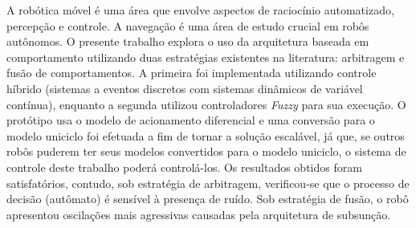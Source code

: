 \begin{resumo}

A robótica móvel é uma área que envolve aspectos de raciocínio automatizado, percepção e 
controle. A navegação é uma área de estudo crucial em robôs autônomos. O presente trabalho 
explora o uso da arquitetura baseada em comportamento utilizando duas estratégias existentes 
na literatura: arbitragem e fusão de comportamentos. A primeira foi implementada utilizando 
controle híbrido (sistemas a eventos discretos com sistemas dinâmicos de variável contínua), 
enquanto a segunda utilizou controladores \textit{Fuzzy} para sua execução. O protótipo usa 
o modelo de acionamento diferencial e uma conversão para o modelo uniciclo foi efetuada a fim
de tornar a solução escalável, já que, se outros robôs puderem ter seus modelos convertidos 
para o modelo uniciclo, o sistema de controle deste trabalho poderá controlá-los. Os 
resultados obtidos foram satisfatórios, contudo, sob estratégia de arbitragem, verificou-se
que o processo de decisão (autômato) é sensível à presença de ruído. Sob estratégia de 
fusão, o robô apresentou oscilações mais agressivas causadas pela arquitetura de subsunção.

\end{resumo}